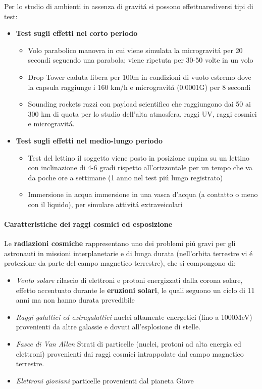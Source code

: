\documentclass[10pt]{article}
\begin{document}
Per lo studio di ambienti in assenza di gravitá si possono effettuarediversi tipi di test:
\begin{itemize}
\item \textbf{Test sugli effetti nel corto periodo} 
\begin{itemize}
\item Volo parabolico \textrightarrow manovra in cui viene simulata la microgravitá per 20 secondi seguendo una parabola; viene ripetuta per 30-50 volte in un volo
\item Drop Tower \textrightarrow caduta libera per 100m in condizioni di vuoto estremo dove la capsula raggiunge i 160 km/h e microgravitá (0.0001G) per 8 secondi
\item Sounding rockets \textrightarrow razzi con payload scientifico che raggiungono dai 50 ai 300 km di quota per lo studio dell'alta atmosfera, raggi UV, raggi cosmici e microgravitá.
\end{itemize}
\item \textbf{Test sugli effetti nel medio-lungo periodo}
\begin{itemize}
\item Test del lettino \textrightarrow il soggetto viene posto in posizione supina su un lettino con inclinazione di 4-6 gradi rispetto all'orizzontale per un tempo che va da poche ore a settimane (1 anno nel test piú lungo registrato)
\item Immersione in acqua \textrightarrow immersione in una vasca d'acqua (a contatto o meno con il liquido), per simulare attivitá extraveicolari
\end{itemize}
\end{itemize}

\paragraph{Caratteristiche dei raggi cosmici ed esposizione}

Le \textbf{radiazioni cosmiche} rappresentano uno dei problemi piú gravi per gli astronauti in missioni interplanetarie e di lunga durata (nell'orbita terrestre vi é protezione da parte del campo magnetico terrestre), che si compongono di:
\begin{itemize}
\item \textit{Vento solare} \textrightarrow rilascio di elettroni e protoni energizzati dalla corona solare, effetto accentuato durante le \textbf{eruzioni solari}, le quali seguono un ciclo di 11 anni ma non hanno durata prevedibile
\item \textit{Raggi galattici ed extragalattici} \textrightarrow nuclei altamente energetici (fino a 1000MeV) provenienti da altre galassie e dovuti all'esplosione di stelle.
\item \textit{Fasce di Van Allen} \textrightarrow Strati di particelle (nuclei, protoni ad alta energia ed elettroni) provenienti dai raggi cosmici intrappolate dal campo magnetico terrestre.
\item \textit{Elettroni gioviani} \textrightarrow particelle provenienti dal pianeta Giove 
\end{itemize}
 
\end{document}
